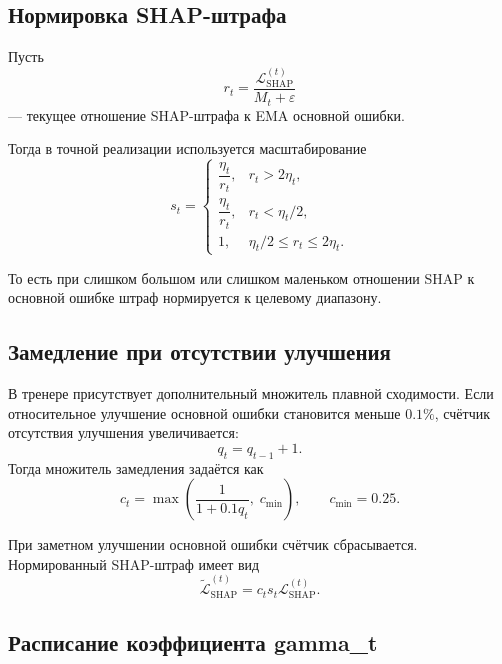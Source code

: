 \documentclass[11pt]{article}
\begin{document}
\subsection{Нормировка SHAP-штрафа}

Пусть
\begin{equation}
 r_t = \frac{\mathcal{L}_{\mathrm{SHAP}}^{(t)}}{M_t + \varepsilon}
\end{equation}
--- текущее отношение SHAP-штрафа к EMA основной ошибки.

Тогда в точной реализации используется масштабирование
\begin{equation}
 s_t =
 \begin{cases}
 \dfrac{\eta_t}{r_t}, & r_t > 2\eta_t,\\[6pt]
 \dfrac{\eta_t}{r_t}, & r_t < \eta_t/2,\\[6pt]
 1, & \eta_t/2 \le r_t \le 2\eta_t.
 \end{cases}
\end{equation}

То есть при слишком большом или слишком маленьком отношении SHAP к основной ошибке штраф нормируется к целевому диапазону.

\subsection{Замедление при отсутствии улучшения}

В тренере присутствует дополнительный множитель плавной сходимости. Если относительное улучшение основной ошибки становится меньше $0.1\%$, счётчик отсутствия улучшения увеличивается:
\begin{equation}
 q_t = q_{t-1} + 1.
\end{equation}
Тогда множитель замедления задаётся как
\begin{equation}
 c_t = \max\!\left(\frac{1}{1 + 0.1 q_t},\; c_{\min}\right),
 \qquad
 c_{\min} = 0.25.
\end{equation}

При заметном улучшении основной ошибки счётчик сбрасывается. Нормированный SHAP-штраф имеет вид
\begin{equation}
\widetilde{\mathcal{L}}_{\mathrm{SHAP}}^{(t)} = c_t s_t \mathcal{L}_{\mathrm{SHAP}}^{(t)}.
\end{equation}

\subsection{Расписание коэффициента gamma\_t}
\end{document}

